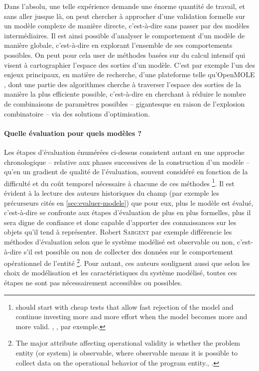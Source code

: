 Dans l'absolu, une telle expérience demande une énorme quantité de travail, et sans aller jusque là, on peut chercher à approcher d'une validation formelle sur un modèle complexe de manière directe, c'est-à-dire sans passer par des modèles intermédiaires.
Il est ainsi possible d'analyser le comportement d'un modèle de manière globale, c'est-à-dire en explorant l'ensemble de ses comportements possibles.
On peut pour cela user de méthodes basées sur du calcul intensif qui visent à cartographier \og l'espace des sorties\fg{} d'un modèle.
C'est par exemple l'un des enjeux principaux, en matière de recherche, d'une plateforme telle qu'OpenMOLE \autocite{reuillon_openmole_2013}, dont une partie des algorithmes \autocite[par exemple][]{cherel_beyond_2015} cherche à traverser l'espace des sorties de la manière la plus efficiente possible, c'est-à-dire en cherchant à réduire le nombre de combinaisons de paramètres possibles -- gigantesque en raison de l'explosion combinatoire -- via des solutions d'optimisation.

\paragraph{Quelle évaluation pour quels modèles ?}\label{par:quelle-eval-quel-modeles}

Les étapes d'évaluation énumérées ci-dessus consistent autant en une approche chronologique -- relative aux phases successives de la construction d'un modèle -- qu'en un gradient de qualité de l'évaluation, souvent considéré en fonction de la difficulté et du coût temporel nécessaire à chacune de ces méthodes
\footnote{
	\og [One] should start with cheap tests that allow fast rejection of the model and continue investing more and more effort when the model becomes more and more valid. \fg{}, \textcite[42]{klugl_validation_2008}, par exemple.
}.
Il est évident à la lecture des auteurs historiques du champ (par exemple les précurseurs cités en \cref{sec:evaluer-modele}) que pour eux, \og plus\fg{} le modèle est évalué, c'est-à-dire se confronte aux étapes d'évaluation de plus en plus formelles, plus il sera digne de confiance et donc capable d'apporter des connaissances sur les objets qu'il tend à représenter.
Robert \textsc{Sargent} par exemple différencie les méthodes d'évaluation selon que le système modélisé est observable ou non, c'est-à-dire \og s'il est possible ou non de collecter des données sur le comportement opérationnel de l'entité \fg{}
\footnote{
	\og The major attribute affecting operational validity is whether the problem entity (or system) is observable, where observable means it is possible to collect data on the operational behavior of the program entity.\fg{}, \textcite[6]{sargent2009verification}.
}.
Pour autant, ces auteurs soulignent aussi que selon les choix de modélisation et les caractéristiques du système modélisé, toutes ces étapes ne sont pas nécessairement accessibles ou possibles.

